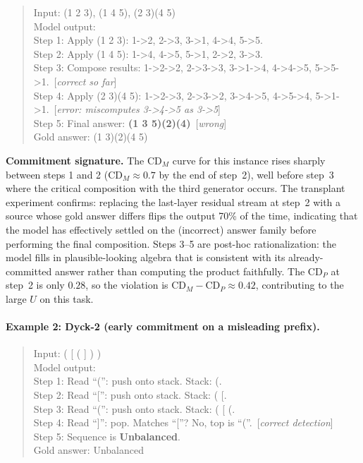 \documentclass[11pt]{article}
\newcommand{\CDP}{\mathrm{CD}_{P}}
\newcommand{\CDM}{\mathrm{CD}_{M}}
\begin{document}
\begin{quote}\small\ttfamily
Input: (1 2 3), (1 4 5), (2 3)(4 5)\\[3pt]
Model output:\\
Step 1: Apply (1 2 3): 1->2, 2->3, 3->1, 4->4, 5->5.\\
Step 2: Apply (1 4 5): 1->4, 4->5, 5->1, 2->2, 3->3.\\
Step 3: Compose results: 1->2->2, 2->3->3, 3->1->4,
4->4->5, 5->5->1.~\textrm{[\emph{correct so far}]}\\
Step 4: Apply (2 3)(4 5): 1->2->3, 2->3->2, 3->4->5,
4->5->4, 5->1->1.~\textrm{[\emph{error: miscomputes 3->4->5 as 3->5}]}\\
Step 5: Final answer: \textbf{(1 3 5)(2)(4)}~\textrm{[\emph{wrong}]}\\
Gold answer: (1 3)(2)(4 5)
\end{quote}

\noindent\textbf{Commitment signature.} The $\CDM$ curve for this instance
rises sharply between steps 1 and 2 ($\CDM \approx 0.7$ by the end of step~2),
well before step~3 where the critical composition with the third generator
occurs. The transplant experiment confirms: replacing the last-layer residual
stream at step~2 with a source whose gold answer differs flips the output 70\%
of the time, indicating that the model has effectively settled on the
(incorrect) answer family before performing the final composition. Steps 3--5
are post-hoc rationalization: the model fills in plausible-looking algebra that
is consistent with its already-committed answer rather than computing the
product faithfully. The $\CDP$ at step~2 is only $0.28$, so the violation is
$\CDM - \CDP \approx 0.42$, contributing to the large $U$ on this task.

\paragraph{Example 2: Dyck-2 (early commitment on a misleading prefix).}

\begin{quote}\small\ttfamily
Input: ( [ ( ] ) )\\[3pt]
Model output:\\
Step 1: Read ``('': push onto stack. Stack: (.\\
Step 2: Read ``['': push onto stack. Stack: ( [.\\
Step 3: Read ``('': push onto stack. Stack: ( [ (.\\
Step 4: Read ``]'': pop. Matches ``[''?
No, top is ``(''.~\textrm{[\emph{correct detection}]}\\
Step 5: Sequence is \textbf{Unbalanced}.\\
Gold answer: Unbalanced
\end{quote}
\end{document}
